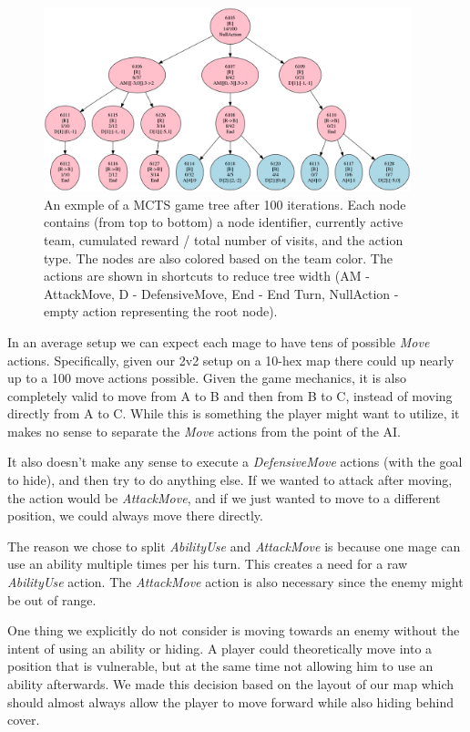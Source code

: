 \begin{figure}
	\centering
	\includegraphics[width=0.95\textwidth]{img/game-tree.png}
	\caption{An exmple of a MCTS game tree after 100 iterations. Each node
contains (from top to bottom) a node identifier, currently active team,
cumulated reward / total number of visits, and the action type. The nodes are
also colored based on the team color. The actions are shown in shortcuts to
reduce tree width (AM - AttackMove, D - DefensiveMove, End - End Turn,
NullAction - empty action representing the root node).}\label{fig:gametree}
\end{figure}

In an average setup we can expect each mage to have tens of possible
\emph{Move} actions. Specifically, given our 2v2 setup on a 10-hex map there
could up nearly up to a 100 move actions possible. Given the game mechanics, it
is also completely valid to move from A to B and then from B to C, instead of
moving directly from A to C. While this is something the player might want to
utilize, it makes no sense to separate the \emph{Move} actions from the point
of the AI\@.

It also doesn't make any sense to execute a \emph{DefensiveMove} actions (with
the goal to hide), and then try to do anything else. If we wanted to attack
after moving, the action would be \emph{AttackMove}, and if we just wanted to
move to a different position, we could always move there directly.

The reason we chose to split \emph{AbilityUse} and \emph{AttackMove} is because one
mage can use an ability multiple times per his turn. This creates a need for a raw
\emph{AbilityUse} action. The \emph{AttackMove} action is also necessary since the enemy
might be out of range.

One thing we explicitly do not consider is moving towards an enemy without the intent
of using an ability or hiding. A player could theoretically move into a position
that is vulnerable, but at the same time not allowing him to use an ability afterwards.
We made this decision based on the layout of our map which should
almost always allow the player to move forward while also hiding behind cover.

